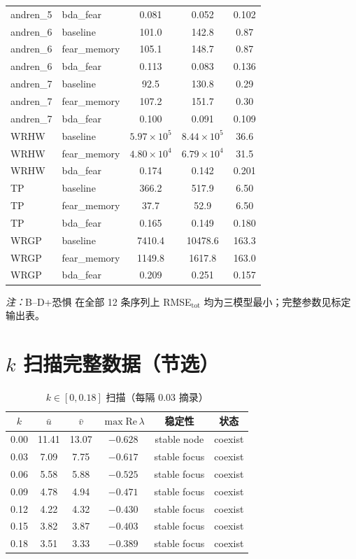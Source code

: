 \documentclass[12pt,a4paper]{ctexart}
\begin{document}
\begin{longtable}{llccc}
  andren\_5 & bda\_fear & 0.081 & 0.052 & 0.102 \\
  andren\_6 & baseline & 101.0 & 142.8 & 0.87 \\
  andren\_6 & fear\_memory & 105.1 & 148.7 & 0.87 \\
  andren\_6 & bda\_fear & 0.113 & 0.083 & 0.136 \\
  andren\_7 & baseline & 92.5 & 130.8 & 0.29 \\
  andren\_7 & fear\_memory & 107.2 & 151.7 & 0.30 \\
  andren\_7 & bda\_fear & 0.100 & 0.091 & 0.109 \\
  WRHW & baseline & $5.97\times 10^5$ & $8.44\times 10^5$ & 36.6 \\
  WRHW & fear\_memory & $4.80\times 10^4$ & $6.79\times 10^4$ & 31.5 \\
  WRHW & bda\_fear & 0.174 & 0.142 & 0.201 \\
  TP & baseline & 366.2 & 517.9 & 6.50 \\
  TP & fear\_memory & 37.7 & 52.9 & 6.50 \\
  TP & bda\_fear & 0.165 & 0.149 & 0.180 \\
  WRGP & baseline & 7410.4 & 10478.6 & 163.3 \\
  WRGP & fear\_memory & 1149.8 & 1617.8 & 163.0 \\
  WRGP & bda\_fear & 0.209 & 0.251 & 0.157 \\
  \bottomrule
\end{longtable}

\noindent\textit{注：}B--D+恐惧 在全部 12 条序列上 RMSE$_{\mathrm{tot}}$ 均为三模型最小；完整参数见标定输出表。

\section{\texorpdfstring{$k$ 扫描完整数据（节选）}{k 扫描完整数据（节选）}}
\label{app:kscan}

\begin{table}[H]
  \centering
  \small
  \caption{$k\in[0,0.18]$ 扫描（每隔 0.03 摘录）}
  \begin{tabular}{cccccc}
    \toprule
    $k$ & $\bar{u}$ & $\bar{v}$ & $\max\mathrm{Re}\,\lambda$ & 稳定性 & 状态 \\
    \midrule
    0.00 & 11.41 & 13.07 & $-0.628$ & stable node & coexist \\
    0.03 & 7.09 & 7.75 & $-0.617$ & stable focus & coexist \\
    0.06 & 5.58 & 5.88 & $-0.525$ & stable focus & coexist \\
    0.09 & 4.78 & 4.94 & $-0.471$ & stable focus & coexist \\
    0.12 & 4.22 & 4.32 & $-0.430$ & stable focus & coexist \\
    0.15 & 3.82 & 3.87 & $-0.403$ & stable focus & coexist \\
    0.18 & 3.51 & 3.33 & $-0.389$ & stable focus & coexist \\
    \bottomrule
  \end{tabular}
\end{table}
\end{document}
